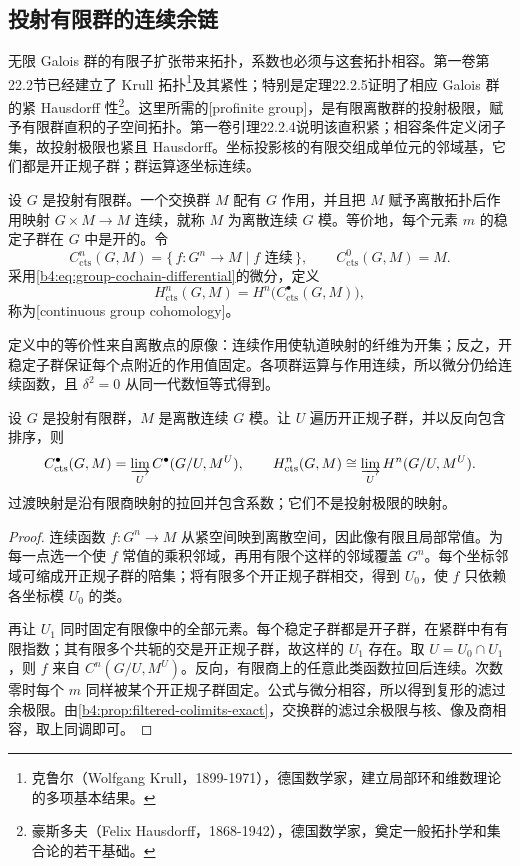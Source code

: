 \subsection{投射有限群的连续余链}
\label{b4:subsec:1104:03}

无限 Galois 群的有限子扩张带来拓扑，系数也必须与这套拓扑相容。第一卷第22.2节已经建立了 Krull 拓扑\footnote{克鲁尔（Wolfgang Krull，1899-1971），德国数学家，建立局部环和维数理论的多项基本结果。}及其紧性；特别是定理22.2.5证明了相应 Galois 群的紧 Hausdorff 性\footnote{豪斯多夫（Felix Hausdorff，1868-1942），德国数学家，奠定一般拓扑学和集合论的若干基础。}。这里所需的[profinite group]，是有限离散群的投射极限，赋予有限群直积的子空间拓扑。第一卷引理22.2.4说明该直积紧；相容条件定义闭子集，故投射极限也紧且 Hausdorff。坐标投影核的有限交组成单位元的邻域基，它们都是开正规子群；群运算逐坐标连续。

\begin{definition}\label{b4:def:continuous-group-cochains}
设 \(G\) 是投射有限群。一个交换群 \(M\) 配有 \(G\) 作用，并且把 \(M\) 赋予离散拓扑后作用映射 \(G\times M\to M\) 连续，就称 \(M\) 为离散连续 \(G\) 模。等价地，每个元素 \(m\) 的稳定子群在 \(G\) 中是开的。令
\[
C_{\mathrm{cts}}^n(G,M)=\{\,f:G^n\to M\mid f\text{ 连续}\,\},
\qquad C_{\mathrm{cts}}^0(G,M)=M.
\]
采用\eqref{b4:eq:group-cochain-differential}的微分，定义
\[
H_{\mathrm{cts}}^n(G,M)=H^n\bigl(C_{\mathrm{cts}}^\bullet(G,M)\bigr),
\]
称为[continuous group cohomology]。
\end{definition}

定义中的等价性来自离散点的原像：连续作用使轨道映射的纤维为开集；反之，开稳定子群保证每个点附近的作用值固定。各项群运算与作用连续，所以微分仍给连续函数，且 \(\delta^2=0\) 从同一代数恒等式得到。

\begin{proposition}\label{b4:prop:continuous-finite-quotients}
设 \(G\) 是投射有限群，\(M\) 是离散连续 \(G\) 模。让 \(U\) 遍历开正规子群，并以反向包含排序，则
\[
C_{\mathrm{cts}}^\bullet(G,M)
=\varinjlim_U C^\bullet(G/U,M^U),\qquad
H_{\mathrm{cts}}^n(G,M)
\cong\varinjlim_U H^n(G/U,M^U).
\]
过渡映射是沿有限商映射的拉回并包含系数；它们不是投射极限的映射。
\end{proposition}
\begin{proof}
连续函数 \(f:G^n\to M\) 从紧空间映到离散空间，因此像有限且局部常值。为每一点选一个使 \(f\) 常值的乘积邻域，再用有限个这样的邻域覆盖 \(G^n\)。每个坐标邻域可缩成开正规子群的陪集；将有限多个开正规子群相交，得到 \(U_0\)，使 \(f\) 只依赖各坐标模 \(U_0\) 的类。

再让 \(U_1\) 同时固定有限像中的全部元素。每个稳定子群都是开子群，在紧群中有有限指数；其有限多个共轭的交是开正规子群，故这样的 \(U_1\) 存在。取 \(U=U_0\cap U_1\)，则 \(f\) 来自 \(C^n(G/U,M^U)\)。反向，有限商上的任意此类函数拉回后连续。次数零时每个 \(m\) 同样被某个开正规子群固定。公式与微分相容，所以得到复形的滤过余极限。由\cref{b4:prop:filtered-colimits-exact}，交换群的滤过余极限与核、像及商相容，取上同调即可。
\end{proof}

